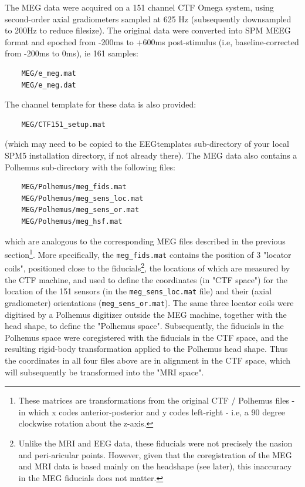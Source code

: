 The MEG data were acquired on a 151 channel CTF Omega system, using second-order axial gradiometers sampled at 625 Hz (subsequently downsampled to 200Hz to reduce filesize).  The original data were converted into SPM MEEG format and epoched from -200ms to +600ms post-stimulus (i.e, baseline-corrected from -200ms to 0ms), ie 161 samples:
\begin{verbatim}
    MEG/e_meg.mat
    MEG/e_meg.dat
\end{verbatim}
The channel template for these data is also provided:
\begin{verbatim}
    MEG/CTF151_setup.mat
\end{verbatim}
(which may need to be copied to the EEGtemplates sub-directory of your local SPM5 installation directory, if not already there).
The MEG data also contains a Polhemus sub-directory with the following files:
\begin{verbatim}
    MEG/Polhemus/meg_fids.mat
    MEG/Polhemus/meg_sens_loc.mat
    MEG/Polhemus/meg_sens_or.mat
    MEG/Polhemus/meg_hsf.mat
\end{verbatim}
which are analogous to the corresponding MEG files described in the previous section\footnote{These matrices are transformations from the original CTF / Polhemus files - in which x codes anterior-posterior and y codes left-right - i.e, a 90 degree clockwise rotation about the z-axis.}. More specifically, the \verb!meg_fids.mat! contains the position of 3 "locator coils", positioned close to the fiducials\footnote{Unlike the MRI and EEG data, these fiducials were not precisely the nasion and peri-aricular points. However, given that the coregistration of the MEG and MRI data is based mainly on the headshape (see later), this inaccuracy in the MEG fiducials does not matter.}, the locations of which are measured by the CTF machine, and used to define the coordinates (in "CTF space") for the location of the 151 sensors (in the \verb!meg_sens_loc.mat! file) and their (axial gradiometer) orientations (\verb!meg_sens_or.mat!). The same three locator coils were digitised by a Polhemus digitizer outside the MEG machine, together with the head shape, to define the "Polhemus space". Subsequently, the fiducials in the Polhemus space were coregistered with the fiducials in the CTF space, and the resulting rigid-body transformation applied to the Polhemus head shape. Thus the coordinates in all four files above are in alignment in the CTF space, which will subsequently be transformed into the "MRI space".



